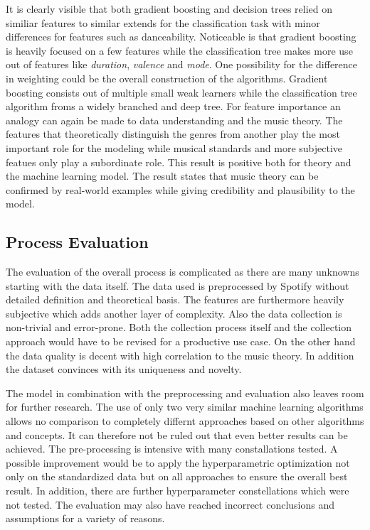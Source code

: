 It is clearly visible that both gradient boosting and decision trees relied on similiar features to similar extends for the classification task with 
minor differences for features such as danceability. Noticeable is that gradient boosting is heavily focused on a few features 
while the classification tree makes more use out of features like \emph{duration}, \emph{valence} and \emph{mode}. One possibility for the difference in weighting  
could be the overall construction of the algorithms. Gradient boosting consists out of multiple small weak learners while the classification tree
algorithm froms a widely branched and deep tree. For feature importance an analogy can again be made to data understanding and the music theory. 
The features that theoretically distinguish the genres from another play the most important role for the modeling while musical standards and 
more subjective featues only play a subordinate role. This result is positive both for theory and the machine learning model. The result states 
that music theory can be confirmed by real-world examples while giving credibility and plausibility to the model.

\subsection{Process Evaluation}

The evaluation of the overall process is complicated as there are many unknowns starting with the data itself. The data used is preprocessed by 
Spotify without detailed definition and theoretical basis. The features are furthermore heavily subjective which adds another layer of 
complexity. Also the data collection is non-trivial and error-prone. Both the collection process itself and the collection approach 
would have to be revised for a productive use case. On the other hand the data quality is decent with high correlation to the music 
theory. In addition the dataset convinces with its uniqueness and novelty.

The model in combination with the preprocessing and evaluation also leaves room for further research. The use of only two very 
similar machine learning algorithms allows no comparison to completely differnt approaches based on other algorithms and concepts. 
It can therefore not be ruled out that even better results can be achieved. The pre-processing is intensive with many constallations 
tested. A possible improvement would be to apply the hyperparametric optimization not only on the standardized data but on all 
approaches to ensure the overall best result. In addition, there are further hyperparameter constellations which were not tested.
The evaluation may also have reached incorrect conclusions and assumptions for a variety of reasons. 

